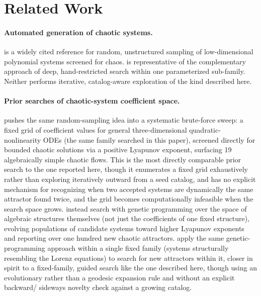 \documentclass[11pt]{article}
\begin{document}
\section{Related Work}

\paragraph{Automated generation of chaotic systems.}
\citet{sprott1993automatic} is a widely cited reference for random,
unstructured sampling of low-dimensional polynomial systems screened for
chaos. \citet{elhadj2013simplest} is representative of the complementary
approach of deep, hand-restricted search within one parameterized sub-family.
Neither performs iterative, catalog-aware exploration of the kind described
here.

\paragraph{Prior searches of chaotic-system coefficient space.}
\citet{sprott1994some} pushes the same random-sampling idea into a
systematic brute-force sweep: a fixed grid of coefficient values for general
three-dimensional quadratic-nonlinearity ODEs (the same family searched in
this paper), screened directly for bounded chaotic solutions via a positive
Lyapunov exponent, surfacing 19 algebraically simple chaotic flows. This is
the most directly comparable prior search to the one reported here, though
it enumerates a fixed grid exhaustively rather than exploring iteratively
outward from a seed catalog, and has no explicit mechanism for recognizing
when two accepted systems are dynamically the same attractor found twice, and the grid becomes computationally infeasible when the search space grows.
\citet{pan2015darwin} instead search with genetic programming over the space
of algebraic structures themselves (not just the coefficients of one
fixed structure), evolving populations of candidate systems toward higher
Lyapunov exponents and reporting over one hundred new chaotic attractors.
\citet{pan2018evolving} apply the same genetic-programming approach within a
single fixed family (systems structurally resembling the Lorenz equations)
to search for new attractors within it, closer in spirit to a fixed-family,
guided search like the one described here, though using an evolutionary
rather than a geodesic expansion rule and without an explicit backward/
sideways novelty check against a growing catalog.
\end{document}
